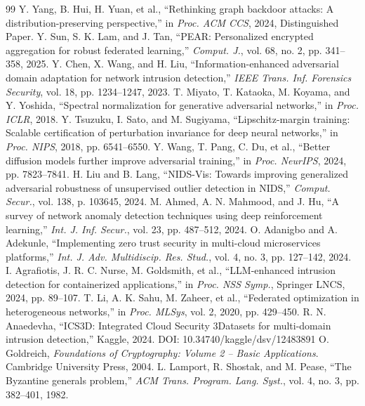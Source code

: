 \documentclass{ieeeaccess}
\theoremstyle{plain}
\theoremstyle{definition}
\theoremstyle{remark}
\begin{document}
\begin{thebibliography}{99}
 Y. Yang, B. Hui, H. Yuan, et al., ``Rethinking graph backdoor attacks: A distribution-preserving perspective,'' in \textit{Proc. ACM CCS}, 2024, Distinguished Paper.
 Y. Sun, S. K. Lam, and J. Tan, ``PEAR: Personalized encrypted aggregation for robust federated learning,'' \textit{Comput. J.}, vol. 68, no. 2, pp. 341--358, 2025.
 Y. Chen, X. Wang, and H. Liu, ``Information-enhanced adversarial domain adaptation for network intrusion detection,'' \textit{IEEE Trans. Inf. Forensics Security}, vol. 18, pp. 1234--1247, 2023.
 T. Miyato, T. Kataoka, M. Koyama, and Y. Yoshida, ``Spectral normalization for generative adversarial networks,'' in \textit{Proc. ICLR}, 2018.
 Y. Tsuzuku, I. Sato, and M. Sugiyama, ``Lipschitz-margin training: Scalable certification of perturbation invariance for deep neural networks,'' in \textit{Proc. NIPS}, 2018, pp. 6541--6550.
 Y. Wang, T. Pang, C. Du, et al., ``Better diffusion models further improve adversarial training,'' in \textit{Proc. NeurIPS}, 2024, pp. 7823--7841.
 H. Liu and B. Lang, ``NIDS-Vis: Towards improving generalized adversarial robustness of unsupervised outlier detection in NIDS,'' \textit{Comput. Secur.}, vol. 138, p. 103645, 2024.
 M. Ahmed, A. N. Mahmood, and J. Hu, ``A survey of network anomaly detection techniques using deep reinforcement learning,'' \textit{Int. J. Inf. Secur.}, vol. 23, pp. 487--512, 2024.
 O. Adanigbo and A. Adekunle, ``Implementing zero trust security in multi-cloud microservices platforms,'' \textit{Int. J. Adv. Multidiscip. Res. Stud.}, vol. 4, no. 3, pp. 127--142, 2024.
 I. Agrafiotis, J. R. C. Nurse, M. Goldsmith, et al., ``LLM-enhanced intrusion detection for containerized applications,'' in \textit{Proc. NSS Symp.}, Springer LNCS, 2024, pp. 89--107.
 T. Li, A. K. Sahu, M. Zaheer, et al., ``Federated optimization in heterogeneous networks,'' in \textit{Proc. MLSys}, vol. 2, 2020, pp. 429--450.
 R. N. Anaedevha, ``ICS3D: Integrated Cloud Security 3Datasets for multi-domain intrusion detection,'' Kaggle, 2024. DOI: 10.34740/kaggle/dsv/12483891
 O. Goldreich, \textit{Foundations of Cryptography: Volume 2 -- Basic Applications}. Cambridge University Press, 2004.
 L. Lamport, R. Shostak, and M. Pease, ``The Byzantine generals problem,'' \textit{ACM Trans. Program. Lang. Syst.}, vol. 4, no. 3, pp. 382--401, 1982.

\end{thebibliography}
\end{document}
